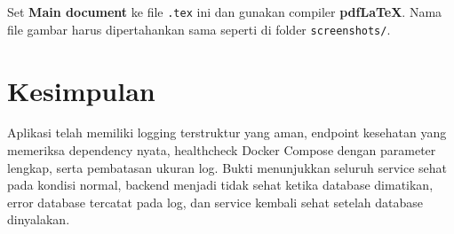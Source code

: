 \documentclass[12pt,a4paper]{article}
\begin{document}
Set \textbf{Main document} ke file \texttt{.tex} ini dan gunakan compiler
\textbf{pdfLaTeX}. Nama file gambar harus dipertahankan sama seperti di folder
\texttt{screenshots/}.

\section{Kesimpulan}

Aplikasi telah memiliki logging terstruktur yang aman, endpoint kesehatan yang
memeriksa dependency nyata, healthcheck Docker Compose dengan parameter lengkap,
serta pembatasan ukuran log. Bukti menunjukkan seluruh service sehat pada kondisi
normal, backend menjadi tidak sehat ketika database dimatikan, error database
tercatat pada log, dan service kembali sehat setelah database dinyalakan.
\end{document}
